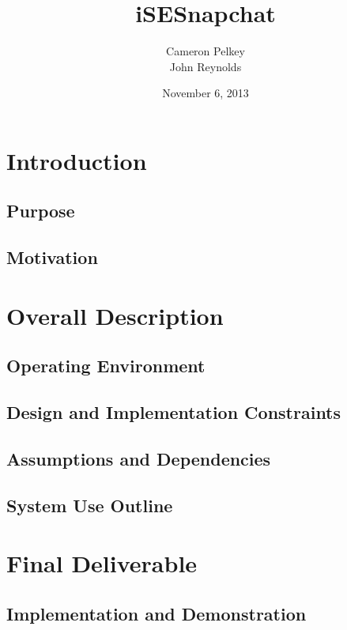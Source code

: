\documentclass[11pt, a4paper,titlepage]{report}
\title{iSESnapchat}
\author{Cameron Pelkey\\John Reynolds}
\date{November 6, 2013}
\begin{document}
\maketitle

\chapter{Introduction}
\section{Purpose}


\section{Motivation}


\chapter{Overall Description}
\section{Operating Environment}



\section{Design and Implementation Constraints}



\section{Assumptions and Dependencies}



\section{System Use Outline}



\chapter{Final Deliverable}
\section{Implementation and Demonstration}


\printbibliography 
\end{document}
